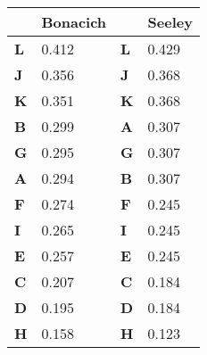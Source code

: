 \begin{table}[!h]
\centering
\begin{tabular}[t]{>{}ll>{}ll}
\toprule
 & Bonacich &  & Seeley\\
\midrule
\textbf{L} & 0.412 & \textbf{L} & 0.429\\
\textbf{J} & 0.356 & \textbf{J} & 0.368\\
\textbf{K} & 0.351 & \textbf{K} & 0.368\\
\textbf{B} & 0.299 & \textbf{A} & 0.307\\
\textbf{G} & 0.295 & \textbf{G} & 0.307\\
\textbf{A} & 0.294 & \textbf{B} & 0.307\\
\textbf{F} & 0.274 & \textbf{F} & 0.245\\
\textbf{I} & 0.265 & \textbf{I} & 0.245\\
\textbf{E} & 0.257 & \textbf{E} & 0.245\\
\textbf{C} & 0.207 & \textbf{C} & 0.184\\
\textbf{D} & 0.195 & \textbf{D} & 0.184\\
\textbf{H} & 0.158 & \textbf{H} & 0.123\\
\bottomrule
\end{tabular}
\end{table}
